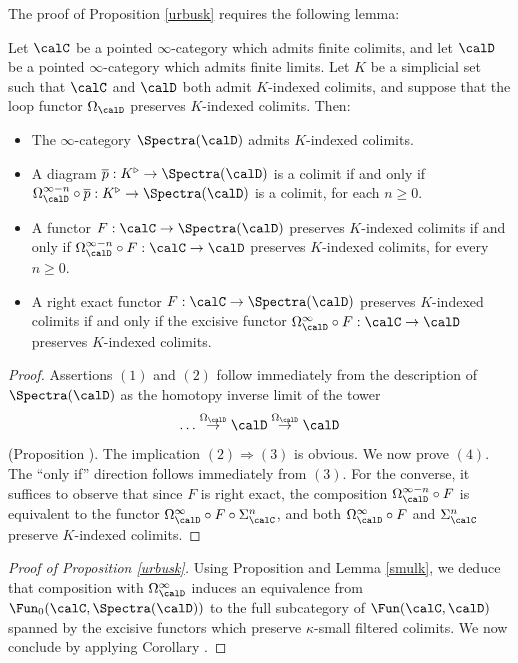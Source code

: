 The proof of Proposition \ref{urbusk} requires the following lemma:

\begin{lemma}\label{smulk}
Let $\calC$ be a pointed $\infty$-category which admits finite colimits, and let 
$\calD$ be a pointed $\infty$-category which admits finite limits. Let $K$ be a simplicial set
such that $\calC$ and $\calD$ both admit $K$-indexed colimits, and suppose that the loop functor
$\Omega_{\calD}$ preserves $K$-indexed colimits. Then:
\begin{itemize}
\item[$(1)$] The $\infty$-category $\Spectra(\calD)$ admits $K$-indexed colimits. 
\item[$(2)$] A diagram $\overline{p}: K^{\triangleright} \rightarrow \Spectra(\calD)$ is a colimit if and only if
$\Omega_{\calD}^{\infty-n} \circ \overline{p}: K^{\triangleright} \rightarrow \Spectra(\calD)$ is a colimit, for each $n \geq 0$.
\item[$(3)$] A functor $F: \calC \rightarrow \Spectra(\calD)$ preserves $K$-indexed colimits
if and only if $\Omega_{\calD}^{\infty-n} \circ F: \calC \rightarrow \calD$ preserves $K$-indexed colimits, for every $n \geq 0$.
\item[$(4)$] A right exact functor $F: \calC \rightarrow \Spectra(\calD)$ preserves $K$-indexed colimits
if and only if the excisive functor $\Omega_{\calD}^{\infty} \circ F: \calC \rightarrow \calD$ preserves $K$-indexed colimits.
\end{itemize}
\end{lemma}

\begin{proof}
Assertions $(1)$ and $(2)$ follow immediately from the description of $\Spectra(\calD)$ as the
homotopy inverse limit of the tower
$$ \ldots \stackrel{\Omega_{\calD}}{\rightarrow} \calD \stackrel{ \Omega_{\calD}}{\rightarrow} \calD$$
(Proposition ). The implication $(2) \Rightarrow (3)$ is obvious. We now prove $(4)$. The ``only if'' direction follows immediately from $(3)$. For the converse, it suffices to observe that since $F$ is right exact, the composition $\Omega_{\calD}^{\infty-n} \circ F$ is equivalent to the functor $\Omega_{\calD}^{\infty} \circ F \circ \Sigma_{\calC}^{n}$, and both
$\Omega_{\calD}^{\infty} \circ F$ and $\Sigma_{\calC}^{n}$ preserve $K$-indexed colimits.
\end{proof}

\begin{proof}[Proof of Proposition \ref{urbusk}]
Using Proposition  and Lemma \ref{smulk}, we deduce that composition with
$\Omega_{\calD}^{\infty}$ induces an equivalence from $\Fun_0( \calC, \Spectra(\calD) )$
to the full subcategory of $\Fun(\calC, \calD)$ spanned by the excisive functors which
preserve $\kappa$-small filtered colimits. We now conclude by applying Corollary .
\end{proof}


